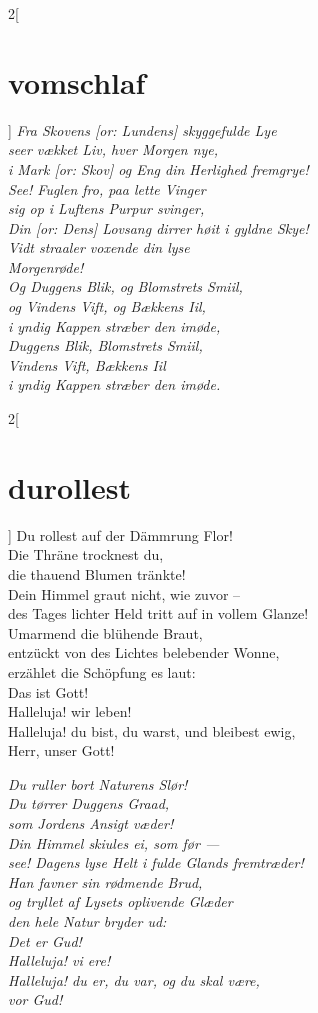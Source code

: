 \documentclass[shorttitlesize=45,tocstyle=ref]{ees}
\begin{document}
{\begin{multicols}{2}[\section{vomschlaf}]
\columnbreak\itshape
Fra Skovens [\textit{or}: Lundens] skyggefulde Lye\\
seer vækket Liv, hver Morgen nye,\\
i Mark [\textit{or}: Skov] og Eng din Herlighed fremgrye!\\
See! Fuglen fro, paa lette Vinger\\
sig op i Luftens Purpur svinger,\\
Din [\textit{or}: Dens] Lovsang dirrer høit i gyldne Skye!\\
Vidt straaler voxende din lyse\\
\hspace*{1em}Morgenrøde!\\
Og Duggens Blik, og Blomstrets Smiil,\\
og Vindens Vift, og Bækkens Iil,\\
i yndig Kappen stræber den imøde,\\
Duggens Blik, Blomstrets Smiil,\\
Vindens Vift, Bækkens Iil\\
i yndig Kappen stræber den imøde.
\end{multicols}

\begin{multicols}{2}[\section{durollest}]
Du rollest auf der Dämmrung Flor!\\
Die Thräne trocknest du,\\
die thauend Blumen tränkte!\\
Dein Himmel graut nicht, wie zuvor –\\
des Tages lichter Held tritt auf in vollem Glanze!\\
Umarmend die blühende Braut,\\
entzückt von des Lichtes belebender Wonne,\\
erzählet die Schöpfung es laut:\\
Das ist Gott!\\
Halleluja! wir leben!\\
Halleluja! du bist, du warst, und bleibest ewig,\\
Herr, unser Gott!

\columnbreak\itshape
Du ruller bort Naturens Slør!\\
Du tørrer Duggens Graad,\\
som Jordens Ansigt væder!\\
Din Himmel skiules ei, som før —\\
see! Dagens lyse Helt i fulde Glands fremtræder!\\
Han favner sin rødmende Brud,\\
og tryllet af Lysets oplivende Glæder\\
den hele Natur bryder ud:\\
Det er Gud!\\
Halleluja! vi ere!\\
Halleluja! du er, du var, og du skal være,\\
vor Gud!
\end{multicols}

}
\end{document}
